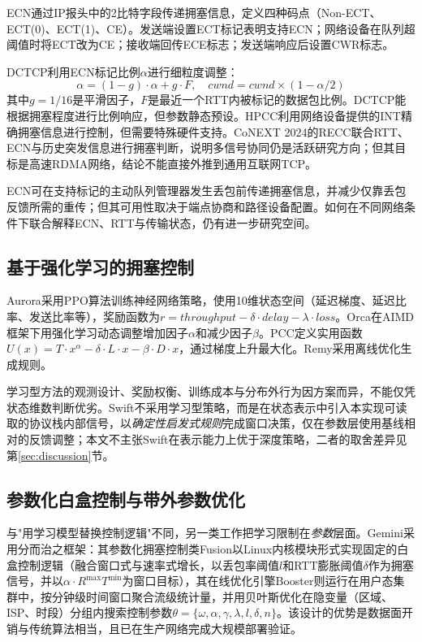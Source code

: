 \documentclass[10pt,twocolumn]{article}
\begin{document}
ECN\cite{rfc3168}通过IP报头中的2比特字段传递拥塞信息，定义四种码点（Non-ECT、ECT(0)、ECT(1)、CE）。发送端设置ECT标记表明支持ECN；网络设备在队列超阈值时将ECT改为CE；接收端回传ECE标志；发送端响应后设置CWR标志。

DCTCP\cite{dctcp}利用ECN标记比例$\alpha$进行细粒度调整：
\begin{equation}
\alpha = (1-g) \cdot \alpha + g \cdot F, \quad cwnd = cwnd \times (1 - \alpha/2)
\end{equation}
其中$g=1/16$是平滑因子，$F$是最近一个RTT内被标记的数据包比例。DCTCP能根据拥塞程度进行比例响应，但参数静态预设。HPCC\cite{hpcc}利用网络设备提供的INT精确拥塞信息进行控制，但需要特殊硬件支持。CoNEXT 2024的RECC\cite{recc2024}联合RTT、ECN与历史突发信息进行拥塞判断，说明多信号协同仍是活跃研究方向；但其目标是高速RDMA网络，结论不能直接外推到通用互联网TCP。

ECN可在支持标记的主动队列管理器发生丢包前传递拥塞信息，并减少仅靠丢包反馈所需的重传；但其可用性取决于端点协商和路径设备配置。如何在不同网络条件下联合解释ECN、RTT与传输状态，仍有进一步研究空间。

\subsection{基于强化学习的拥塞控制}

Aurora\cite{aurora}采用PPO算法训练神经网络策略，使用10维状态空间（延迟梯度、延迟比率、发送比率等），奖励函数为$r = throughput - \delta \cdot delay - \lambda \cdot loss$。Orca\cite{orca}在AIMD框架下用强化学习动态调整增加因子$\alpha$和减少因子$\beta$。PCC\cite{pcc}定义实用函数$U(x) = T \cdot x^\alpha - \delta \cdot L \cdot x - \beta \cdot D \cdot x$，通过梯度上升最大化。Remy\cite{remy}采用离线优化生成规则。

学习型方法的观测设计、奖励权衡、训练成本与分布外行为因方案而异，不能仅凭状态维数判断优劣。Swift不采用学习型策略，而是在状态表示中引入本实现可读取的协议栈内部信号，以\emph{确定性启发式规则}完成窗口决策，仅在参数层使用基线相对的反馈调整；本文不主张Swift在表示能力上优于深度策略，二者的取舍差异见第\ref{sec:discussion}节。

\subsection{参数化白盒控制与带外参数优化}
\label{subsec:gemini}

与"用学习模型替换控制逻辑"不同，另一类工作把学习限制在\emph{参数}层面。Gemini\cite{gemini}采用分而治之框架：其参数化拥塞控制类Fusion以Linux内核模块形式实现固定的白盒控制逻辑（融合窗口式与速率式增长，以丢包率阈值$l$和RTT膨胀阈值$\delta$作为拥塞信号，并以$\alpha \cdot R^{\max}T^{\min}$为窗口目标），其在线优化引擎Booster则运行在用户态集群中，按分钟级时间窗口聚合流级统计量，并用贝叶斯优化在隐变量（区域、ISP、时段）分组内搜索控制参数$\theta=\{\omega,\alpha,\gamma,\lambda,l,\delta,n\}$。该设计的优势是数据面开销与传统算法相当，且已在生产网络完成大规模部署验证。
\end{document}
